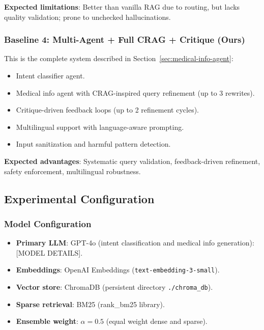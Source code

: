 \documentclass[11pt,a4paper]{article}
\begin{document}
\textbf{Expected limitations}: Better than vanilla RAG due to routing, but lacks quality validation; prone to unchecked hallucinations.

\subsubsection{Baseline 4: Multi-Agent + Full CRAG + Critique (Ours)}
This is the complete system described in Section~\ref{sec:medical-info-agent}:
\begin{itemize}
    \item Intent classifier agent.
    \item Medical info agent with CRAG-inspired query refinement (up to 3 rewrites).
    \item Critique-driven feedback loops (up to 2 refinement cycles).
    \item Multilingual support with language-aware prompting.
    \item Input sanitization and harmful pattern detection.
\end{itemize}

\textbf{Expected advantages}: Systematic query validation, feedback-driven refinement, safety enforcement, multilingual robustness.

\subsection{Experimental Configuration}
\label{sec:setup-config}

\subsubsection{Model Configuration}
\begin{itemize}
    \item \textbf{Primary LLM}: GPT-4o (intent classification and medical info generation): [MODEL DETAILS].
    \item \textbf{Embeddings}: OpenAI Embeddings (\texttt{text-embedding-3-small}).
    \item \textbf{Vector store}: ChromaDB (persistent directory \texttt{./chroma\_db}).
    \item \textbf{Sparse retrieval}: BM25 (rank\_bm25 library).
    \item \textbf{Ensemble weight}: $\alpha = 0.5$ (equal weight dense and sparse).
\end{itemize}
\end{document}
